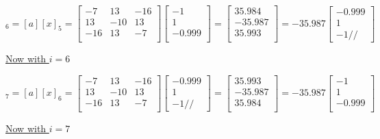 \documentclass{article}
\begin{document}
\begin{equation*}
[x]_6 = [a][x]_5 =
\begin{bmatrix}
-7 & 13 & -16 \\
13 & -10 & 13 \\
-16 & 13 & -7 \\
\end{bmatrix}
\begin{bmatrix}
-1\\
1\\
-0.999\\
\end{bmatrix}
=
\begin{bmatrix}
35.984\\
-35.987\\
35.993\\
\end{bmatrix}
=-35.987
\begin{bmatrix}
-0.999\\
1\\
-1//
\end{bmatrix}
\end{equation*}

\underline{Now with $i = 6$}


\begin{equation*}
[x]_7 = [a][x]_6 =
\begin{bmatrix}
-7 & 13 & -16 \\
13 & -10 & 13 \\
-16 & 13 & -7 \\
\end{bmatrix}
\begin{bmatrix}
-0.999\\
1\\
-1//
\end{bmatrix}
=
\begin{bmatrix}
35.993\\
-35.987\\
35.984\\
\end{bmatrix}
=-35.987
\begin{bmatrix}
-1\\
1\\
-0.999\\
\end{bmatrix}
\end{equation*}

\underline{Now with $i = 7$}
\end{document}
